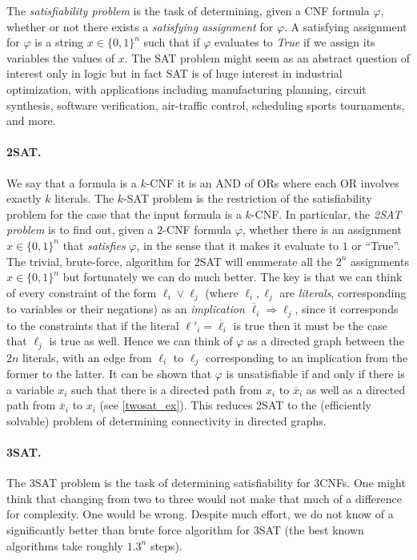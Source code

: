 The \emph{satisfiability problem} is the task of determining, given a
CNF formula \(\varphi\), whether or not there exists a \emph{satisfying
assignment} for \(\varphi\). A satisfying assignment for \(\varphi\) is
a string \(x\in \{0,1\}^n\) such that if \(\varphi\) evaluates to
\emph{True} if we assign its variables the values of \(x\). The SAT
problem might seem as an abstract question of interest only in logic but
in fact SAT is of huge interest in industrial optimization, with
applications including manufacturing planning, circuit synthesis,
software verification, air-traffic control, scheduling sports
tournaments, and more.

\paragraph{2SAT.} We say that a formula is a \(k\)-CNF it is an AND of
ORs where each OR involves exactly \(k\) literals. The \(k\)-SAT problem
is the restriction of the satisfiability problem for the case that the
input formula is a \(k\)-CNF. In particular, the \emph{2SAT problem} is
to find out, given a \(2\)-CNF formula \(\varphi\), whether there is an
assignment \(x\in \{0,1\}^n\) that \emph{satisfies} \(\varphi\), in the
sense that it makes it evaluate to \(1\) or ``True''. The trivial,
brute-force, algorithm for 2SAT will enumerate all the \(2^n\)
assignments \(x\in \{0,1\}^n\) but fortunately we can do much better.
The key is that we can think of every constraint of the form
\(\ell_i \vee \ell_j\) (where \(\ell_i,\ell_j\) are \emph{literals},
corresponding to variables or their negations) as an \emph{implication}
\(\overline{\ell}_i \Rightarrow \ell_j\), since it corresponds to the
constraints that if the literal \(\ell'_i = \overline{\ell}_i\) is true
then it must be the case that \(\ell_j\) is true as well. Hence we can
think of \(\varphi\) as a directed graph between the \(2n\) literals,
with an edge from \(\ell_i\) to \(\ell_j\) corresponding to an
implication from the former to the latter. It can be shown that
\(\varphi\) is unsatisfiable if and only if there is a variable \(x_i\)
such that there is a directed path from \(x_i\) to \(\overline{x}_i\) as
well as a directed path from \(\overline{x}_i\) to \(x_i\) (see
\cref{twosat_ex}). This reduces 2SAT to the (efficiently solvable)
problem of determining connectivity in directed graphs.

\paragraph{3SAT.} The 3SAT problem is the task of determining
satisfiability for 3CNFs. One might think that changing from two to
three would not make that much of a difference for complexity. One would
be wrong. Despite much effort, we do not know of a significantly better
than brute force algorithm for 3SAT (the best known algorithms take
roughly \(1.3^n\) steps).


